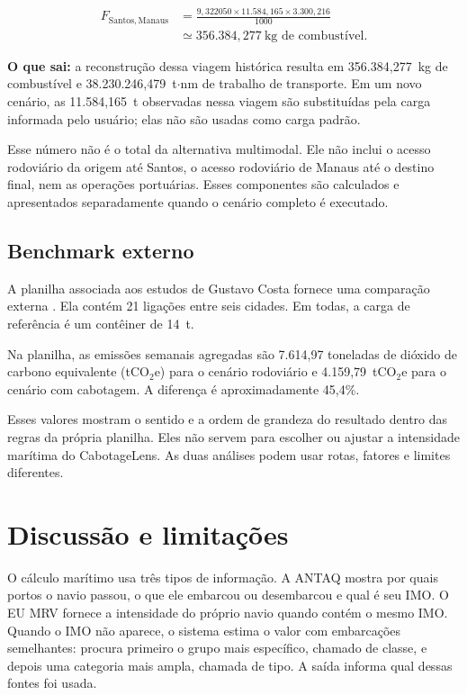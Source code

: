 \documentclass[12pt,a4paper]{article}
\begin{document}
\begin{equation}
\begin{split}
F_{\mathrm{Santos,Manaus}}
&=\frac{9{,}322050\times11.584{,}165\times3.300{,}216}{1000}\\
&\simeq356.384{,}277~\text{kg de combustível}.
\end{split}
\label{eq:exemplo-santos-manaus}
\end{equation}

\textbf{O que sai:} a reconstrução dessa viagem histórica resulta em 356.384,277~kg de combustível e 38.230.246,479~t$\cdot$nm de trabalho de transporte. Em um novo cenário, as 11.584,165~t observadas nessa viagem são substituídas pela carga informada pelo usuário; elas não são usadas como carga padrão.

Esse número não é o total da alternativa multimodal. Ele não inclui o acesso rodoviário da origem até Santos, o acesso rodoviário de Manaus até o destino final, nem as operações portuárias. Esses componentes são calculados e apresentados separadamente quando o cenário completo é executado.

\subsection{Benchmark externo}

A planilha associada aos estudos de Gustavo Costa fornece uma comparação externa \cite{workbookdados}. Ela contém 21 ligações entre seis cidades. Em todas, a carga de referência é um contêiner de 14~t.

Na planilha, as emissões semanais agregadas são 7.614,97 toneladas de dióxido de carbono equivalente (tCO$_2$e) para o cenário rodoviário e 4.159,79~tCO$_2$e para o cenário com cabotagem. A diferença é aproximadamente 45,4\%.

Esses valores mostram o sentido e a ordem de grandeza do resultado dentro das regras da própria planilha. Eles não servem para escolher ou ajustar a intensidade marítima do CabotageLens. As duas análises podem usar rotas, fatores e limites diferentes.

\section{Discussão e limitações}
\label{sec:discussao}

O cálculo marítimo usa três tipos de informação. A ANTAQ mostra por quais portos o navio passou, o que ele embarcou ou desembarcou e qual é seu IMO. O EU MRV fornece a intensidade do próprio navio quando contém o mesmo IMO. Quando o IMO não aparece, o sistema estima o valor com embarcações semelhantes: procura primeiro o grupo mais específico, chamado de classe, e depois uma categoria mais ampla, chamada de tipo. A saída informa qual dessas fontes foi usada.
\end{document}

